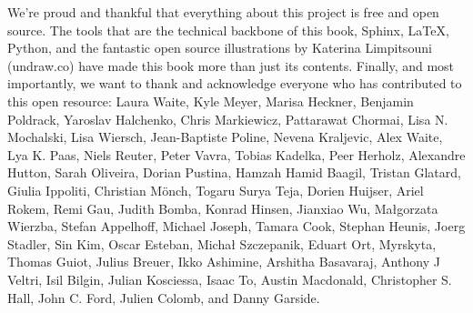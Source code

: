 We’re proud and thankful that everything about this project is free and open
source. The tools that are the technical backbone of this book, Sphinx, LaTeX,
Python, and the fantastic open source illustrations by Katerina Limpitsouni
(undraw.co) have made this book more than just its contents.  Finally, and most
importantly, we want to thank and acknowledge everyone who has contributed to
this open resource: Laura Waite, Kyle Meyer, Marisa Heckner, Benjamin
Poldrack, Yaroslav Halchenko, Chris Markiewicz, Pattarawat Chormai, Lisa N.
Mochalski, Lisa Wiersch, Jean-Baptiste Poline, Nevena Kraljevic, Alex Waite,
Lya K. Paas, Niels Reuter, Peter Vavra, Tobias Kadelka, Peer Herholz, Alexandre
Hutton, Sarah Oliveira, Dorian Pustina, Hamzah Hamid Baagil, Tristan Glatard,
Giulia Ippoliti, Christian Mönch, Togaru Surya Teja, Dorien Huijser, Ariel
Rokem, Remi Gau, Judith Bomba, Konrad Hinsen, Jianxiao Wu, Małgorzata Wierzba,
Stefan Appelhoff, Michael Joseph, Tamara Cook, Stephan Heunis, Joerg Stadler,
Sin Kim, Oscar Esteban, Michał Szczepanik, Eduart Ort, Myrskyta, Thomas Guiot,
Julius Breuer, Ikko Ashimine, Arshitha Basavaraj, Anthony J Veltri, Isil Bilgin,
Julian Kosciessa, Isaac To, Austin Macdonald, Christopher S. Hall, John C. Ford,
Julien Colomb, and Danny Garside.
